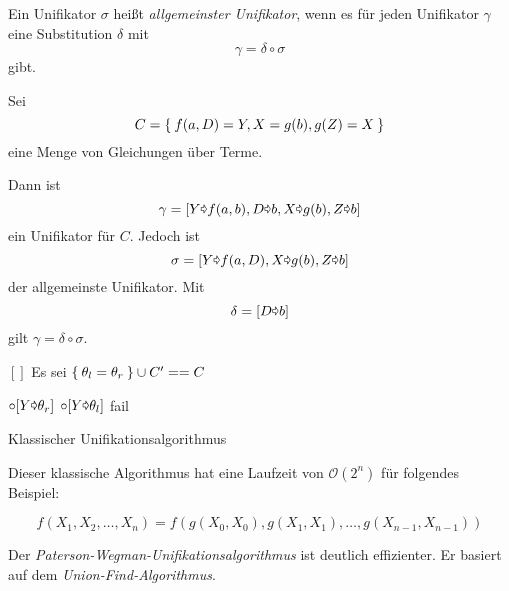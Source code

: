 \begin{definition}%
    Ein Unifikator $\sigma$ heißt \textit{allgemeinster Unifikator}, wenn 
    es für jeden Unifikator $\gamma$ eine Substitution $\delta$ mit
    \[\gamma = \delta \circ \sigma\]
    gibt.
\end{definition}

\begin{beispiel}
    Sei
    \[C = \Set{f(a,D) = Y, X = g(b), g(Z) = X}\]
    eine Menge von Gleichungen über Terme.

    Dann ist 
    \[\gamma = [Y \text{\pointer} f(a,b), D \text{\pointer} b, X \text{\pointer} g(b), Z \text{\pointer} b]\]
    ein Unifikator für $C$. Jedoch ist
    \[\sigma = [Y \text{\pointer} f(a,D), X \text{\pointer} g(b), Z \text{\pointer} b]\]
    der allgemeinste Unifikator. Mit
    \[\delta = [D \text{\pointer} b]\]
    gilt $\gamma = \delta \circ \sigma$.
\end{beispiel}

\begin{algorithm}[h]
    \begin{algorithmic}
            \State \Return $[]$
        \Else
            \State Es sei $\Set{\theta_l = \theta_r} \cup C' == C$

                \State {}
                \State {} $\circ [Y \text{\pointer} \theta_r]$
                \State {} $\circ [Y \text{\pointer} \theta_l]$
                \State {}
            \Else
                \State fail
            \EndIf
        \EndIf
        \EndFunction
    \end{algorithmic}
\caption{Klassischer Unifikationsalgorithmus}
\label{alg:klassischer-unifikationsalgorithmus}
\end{algorithm}

Dieser klassische Algorithmus hat eine Laufzeit von $\mathcal{O}(2^n)$ für folgendes
Beispiel:

\[f(X_1, X_2, \dots, X_n) = f(g(X_0, X_0), g(X_1, X_1), \dots, g(X_{n-1}, X_{n-1}) )\]

Der \textit{Paterson-Wegman-Unifikationsalgorithmus} ist deutlich effizienter.
Er basiert auf dem \textit{Union-Find-Algorithmus}.


